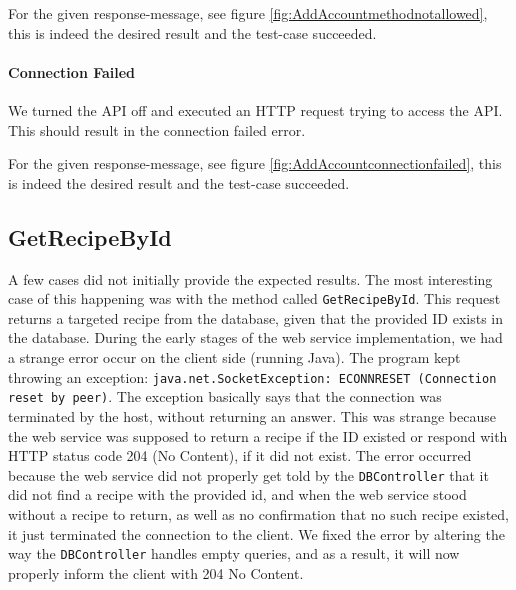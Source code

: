 For the given response-message, see figure \ref{fig:AddAccountmethodnotallowed}, this is indeed the desired result and the test-case succeeded.
\paragraph{Connection Failed}
We turned the API off and executed an HTTP request trying to access the API. This should result in the connection failed error. 

For the given response-message, see figure \ref{fig:AddAccountconnectionfailed}, this is indeed the desired result and the test-case succeeded.

\subsection{GetRecipeById}
A few cases did not initially provide the expected results. The most interesting case of this happening was with the method called \texttt{GetRecipeById}.
This request returns a targeted recipe from the database, given that the provided ID exists in the database. During the early stages of the web service implementation, we had a strange error occur on the client side (running Java). The program kept throwing an exception: \texttt{java.net.SocketException: ECONNRESET (Connection reset by peer)}\cite{socketexception}. The exception basically says that the connection was terminated by the host, without returning an answer. This was strange because the web service was supposed to return a recipe if the ID existed or respond with HTTP status code 204 (No Content), if it did not exist. The error occurred because the web service did not properly get told by the \texttt{DBController} that it did not find a recipe with the provided id, and when the web service stood without a recipe to return, as well as no confirmation that no such recipe existed, it just terminated the connection to the client. We fixed the error by altering the way the \texttt{DBController} handles empty queries, and as a result, it will now properly inform the client with 204 No Content.


